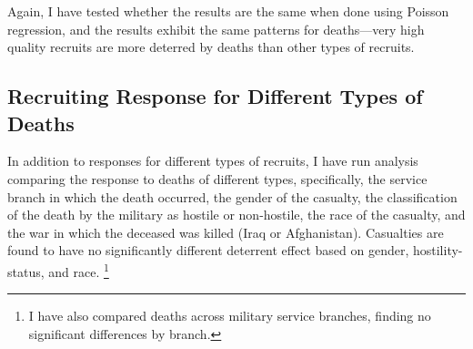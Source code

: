 \documentclass[12pt] {article}
\begin{document}
Again, I have tested whether the results are the same when done using Poisson regression, and the results exhibit the same patterns for deaths---very high quality recruits are more deterred by deaths than other types of recruits.


\subsection{Recruiting Response for Different Types of Deaths\label{sub:Different Death Types}}

In addition to responses for different types of recruits, I have run analysis comparing the response to deaths of different types, specifically, the service branch in which the death occurred, the gender of the casualty, the classification of the death by the military as hostile or non-hostile, the race of
the casualty, and the war in which the deceased was killed (Iraq or
Afghanistan). Casualties are found to have no significantly different
deterrent effect based on gender, hostility-status, and race.%
\footnote{%
I have also compared deaths across military service branches, finding no significant differences by branch.} 
\end{document}
